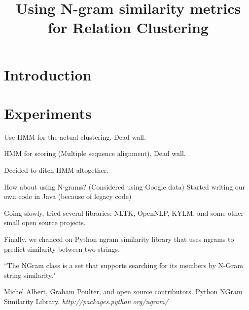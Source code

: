 \documentclass{article}
\begin{document}
\sloppy

\def\x{{\mathbf x}}
\def\L{{\cal L}}


\title{Using N-gram similarity metrics for Relation Clustering}
%

\address{
\textit{mayhewsw@rose-hulman.edu}\\
\textit{kampernj@rose-hulman.edu}\\
Rose-Hulman Institute of Technology}


\maketitle
\thispagestyle{fancy} \fancyhead{} \lhead{}
 \cfoot{}
\renewcommand{\headrulewidth}{0pt}
\renewcommand{\footrulewidth}{0pt}


%
%
%
\section{Introduction}
\label{sec:intro}





\section{Experiments}

Use HMM for the actual clustering. Dead wall.

HMM for scoring (Multiple sequence alignment). Dead wall.

Decided to ditch HMM altogether.

How about using N-grams? (Considered using Google data)
Started writing our own code in Java (because of legacy code)

Going slowly, tried several libraries: NLTK, OpenNLP, KYLM, and some other small open source projects.

Finally, we chanced on Python ngram similarity library that uses ngrams to predict similarity between two strings. 

``The NGram class is a set that supports searching for its members by N-Gram string similarity." \cite{py_ngram_lib}


\begin{thebibliography}{1}

Michel Albert, Graham Poulter, and open source contributors. Python NGram Similarity Library. \textit{http://packages.python.org/ngram/}
\end{thebibliography}
\end{document}
